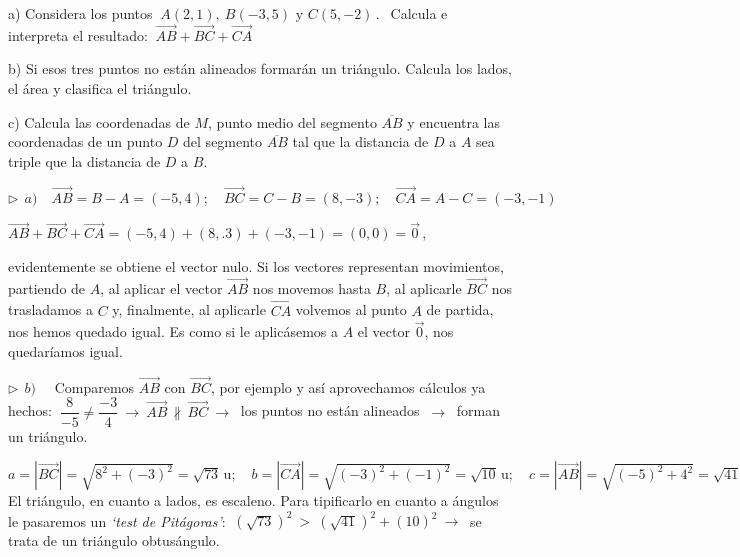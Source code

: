 \vspace{5mm}
\begin{miejemplo}

a) Considera los puntos $\ A(2,1),\ B(-3,5)  \text{ y } C(5,-2)\, . \ \ $ Calcula e interpreta el resultado: $\  \overrightarrow{AB}+ \overrightarrow{BC}+ \overrightarrow{CA}$

\vspace{1mm} b) Si esos tres puntos no están alineados formarán un triángulo. Calcula los lados, el área y clasifica el triángulo.

\vspace{1mm} c) Calcula las coordenadas de $M$,  punto medio del segmento $\overline{AB}$  y encuentra las coordenadas de un punto $D$ del segmento $\overline{AB}$ tal que la distancia de $D$ a $A$ sea triple que la distancia de $D$ a $B$.

\vspace{6mm} $\triangleright \ \ a)\quad \overrightarrow{AB}=B-A=(-5,4);\quad \overrightarrow{BC}=C-B=(8,-3); \quad \overrightarrow{CA}=A-C=(-3,-1)$

\vspace{2mm} $\overrightarrow{AB}+ \overrightarrow{BC}+ \overrightarrow{CA}=(-5,4)+(8,.3)+(-3,-1)=(0,0)=\vec 0\, , \ $ \begin{small} evidentemente se obtiene el vector nulo. Si los vectores representan movimientos, partiendo de $A$, al aplicar el vector $\overrightarrow{AB}$ nos movemos hasta $B$, al aplicarle $\overrightarrow{BC}$ nos trasladamos a $C$ y, finalmente, al aplicarle $\overrightarrow{CA}$ volvemos al punto $A$ de partida, nos hemos quedado igual. Es como si le aplicásemos a $A$ el vector $\vec 0$, nos quedaríamos igual.\end{small}

\vspace{4mm} $\triangleright \ \ b)\quad $ Comparemos $\overrightarrow{AB}$ con $\overrightarrow{BC}$, por ejemplo y así aprovechamos cálculos ya hechos: $\ \dfrac{8}{-5}\neq \dfrac{-3}{4} \ \to \ \overrightarrow{AB} \, \not \parallel \, \overrightarrow{BC} \ \to \ $ los puntos no están alineados $\ \to \ $ forman un triángulo.

\vspace{2mm} $a=|\overrightarrow{BC}|=\sqrt{8^2+(-3)^2}=\sqrt{73}\, \mathrm{u}; \quad b=|\overrightarrow{CA}|=\sqrt{(-3)^2+(-1)^2}=\sqrt{10}\, \mathrm{u};\quad c=|\overrightarrow{AB}|=\sqrt{(-5)^2+4^2}=\sqrt{41}\, \mathrm{u}\, .\ $ El triángulo, en cuanto a lados, es escaleno. Para tipificarlo en cuanto a ángulos le pasaremos un \emph{`test de Pitágoras'}: $\ (\sqrt{73})^2 \ > \ (\sqrt{41})^2+(10)^2 \ \to \ $ se trata de un triángulo obtusángulo.


\end{miejemplo}
